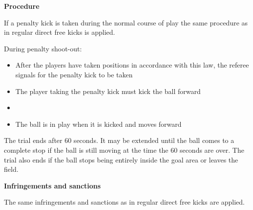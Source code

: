 \bigskip

{\bfseries Procedure}

\headlinebox

If a penalty kick is taken during the normal course of play the same procedure
as in regular direct free kicks is applied.

\bigskip
During penalty shoot-out:
\begin{itemize}
\item After the players have taken positions in accordance with this law,
      the referee signals for the penalty kick to be taken
\item The player taking the penalty kick must kick the ball forward
\item {}
\item The ball is in play when it is kicked and moves forward
\end{itemize}


\bigskip

The trial ends after 60 seconds.
It may be extended until the ball comes to a complete stop if the ball is still
moving at the time the 60 seconds are over.
The trial also ends if the ball stops being entirely inside the goal area or
leaves the field.

\bigskip


\bigskip

{\bfseries Infringements and sanctions }

\headlinebox

The same infringements and sanctions as in regular direct free kicks are applied.

